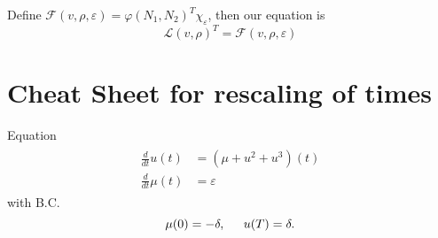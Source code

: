 \documentclass[letterpaper,11pt]{article}
\newcommand{\eps}{\varepsilon}
\numberwithin{equation}{section}
\theoremstyle{plain}
\begin{document}
Define $\mathcal{F}(v,\rho,\eps) = \varphi(N_1,N_2)^T\chi_\eps$, then our equation is
\[
\mathcal{L}(v,\rho)^T  = \mathcal{F}(v,\rho,\eps)
\]
\pagebreak

\section{Cheat Sheet for rescaling of times}
Equation
\begin{align}
\begin{split}
\frac{d}{dt}u(t) &= (\mu+u^2+u^3)(t) \\
\frac{d}{dt}\mu (t)&=  \eps 
\end{split}
\end{align}
with B.C.
\begin{equation}
\mu(0) = -\delta, \hspace{0.2in} u(T) = \delta.
\end{equation}
\end{document}
